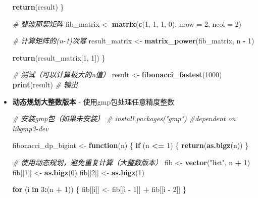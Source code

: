 \documentclass[
  twoside]{book}
\newenvironment{Shaded}{\begin{snugshade}}{\end{snugshade}}
\newcommand{\AttributeTok}[1]{\textcolor[rgb]{0.13,0.29,0.53}{#1}}
\newcommand{\CommentTok}[1]{\textcolor[rgb]{0.56,0.35,0.01}{\textit{#1}}}
\newcommand{\ControlFlowTok}[1]{\textcolor[rgb]{0.13,0.29,0.53}{\textbf{#1}}}
\newcommand{\DecValTok}[1]{\textcolor[rgb]{0.00,0.00,0.81}{#1}}
\newcommand{\FunctionTok}[1]{\textcolor[rgb]{0.13,0.29,0.53}{\textbf{#1}}}
\newcommand{\NormalTok}[1]{#1}
\newcommand{\OtherTok}[1]{\textcolor[rgb]{0.56,0.35,0.01}{#1}}
\newcommand{\SpecialCharTok}[1]{\textcolor[rgb]{0.81,0.36,0.00}{\textbf{#1}}}
\newcommand{\StringTok}[1]{\textcolor[rgb]{0.31,0.60,0.02}{#1}}
\begin{document}
\begin{itemize}
\begin{Shaded}
\begin{Highlighting}[]
    \FunctionTok{return}\NormalTok{(result)}
\NormalTok{  \}}

  \CommentTok{\# 斐波那契矩阵}
\NormalTok{  fib\_matrix }\OtherTok{\textless{}{-}} \FunctionTok{matrix}\NormalTok{(}\FunctionTok{c}\NormalTok{(}\DecValTok{1}\NormalTok{, }\DecValTok{1}\NormalTok{, }\DecValTok{1}\NormalTok{, }\DecValTok{0}\NormalTok{), }\AttributeTok{nrow =} \DecValTok{2}\NormalTok{, }\AttributeTok{ncol =} \DecValTok{2}\NormalTok{)}

  \CommentTok{\# 计算矩阵的(n{-}1)次幂}
\NormalTok{  result\_matrix }\OtherTok{\textless{}{-}} \FunctionTok{matrix\_power}\NormalTok{(fib\_matrix, n }\SpecialCharTok{{-}} \DecValTok{1}\NormalTok{)}

  \FunctionTok{return}\NormalTok{(result\_matrix[}\DecValTok{1}\NormalTok{, }\DecValTok{1}\NormalTok{])}
\NormalTok{\}}

\CommentTok{\# 测试（可以计算极大的n值）}
\NormalTok{result }\OtherTok{\textless{}{-}} \FunctionTok{fibonacci\_fastest}\NormalTok{(}\DecValTok{1000}\NormalTok{)}
\FunctionTok{print}\NormalTok{(result)  }\CommentTok{\# 输出}
\end{Highlighting}
\end{Shaded}
\item
  \textbf{动态规划大整数版本} - 使用gmp包处理任意精度整数

\begin{Shaded}
\begin{Highlighting}[]
\CommentTok{\# 安装gmp包（如果未安装）}
\CommentTok{\# install.packages("gmp") \#dependent on libgmp3{-}dev}

\NormalTok{fibonacci\_dp\_bigint }\OtherTok{\textless{}{-}} \ControlFlowTok{function}\NormalTok{(n) \{}
  \ControlFlowTok{if}\NormalTok{ (n }\SpecialCharTok{\textless{}=} \DecValTok{1}\NormalTok{) \{}
    \FunctionTok{return}\NormalTok{(}\FunctionTok{as.bigz}\NormalTok{(n))}
\NormalTok{  \}}

  \CommentTok{\# 使用动态规划，避免重复计算（大整数版本）}
\NormalTok{  fib }\OtherTok{\textless{}{-}} \FunctionTok{vector}\NormalTok{(}\StringTok{"list"}\NormalTok{, n }\SpecialCharTok{+} \DecValTok{1}\NormalTok{)}
\NormalTok{  fib[[}\DecValTok{1}\NormalTok{]] }\OtherTok{\textless{}{-}} \FunctionTok{as.bigz}\NormalTok{(}\DecValTok{0}\NormalTok{)}
\NormalTok{  fib[[}\DecValTok{2}\NormalTok{]] }\OtherTok{\textless{}{-}} \FunctionTok{as.bigz}\NormalTok{(}\DecValTok{1}\NormalTok{)}

  \ControlFlowTok{for}\NormalTok{ (i }\ControlFlowTok{in} \DecValTok{3}\SpecialCharTok{:}\NormalTok{(n }\SpecialCharTok{+} \DecValTok{1}\NormalTok{)) \{}
\NormalTok{    fib[[i]] }\OtherTok{\textless{}{-}}\NormalTok{ fib[[i }\SpecialCharTok{{-}} \DecValTok{1}\NormalTok{]] }\SpecialCharTok{+}\NormalTok{ fib[[i }\SpecialCharTok{{-}} \DecValTok{2}\NormalTok{]]}
\NormalTok{  \}}


\end{Highlighting}
\end{Shaded}
\end{itemize}
\end{document}
